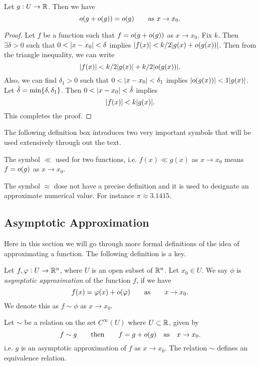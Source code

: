 \begin{lemma}
	\label{lem:LittleOofLittleOsummed}
	Let $ g: U \to \mathbb{R} $. Then we have
	\[ o(g + o(g)) = o (g) \qquad \text{as } x \to x_0. \]
\end{lemma}
\begin{proof}
	Let $ f $ be a function such that $ f = o(g + o(g)) $ as $ x \to x_0 $. Fix $ k $. Then $ \exists \delta > 0 $ such that $ 0 < |x - x_0| < \delta $ implies $ |f(x)| < k/2|g(x) + o(g(x))|$. Then from the triangle inequality, we can write
	\[   |f(x)| < k/2|g(x)| + k/2|o(g(x))|. \]
	Also, we can find $ \delta_1 > 0 $ such that $ 0<\abs{x - x_0} < \delta_1 $ implies $ |o(g(x))| < 1 |g(x)| $. Let $ \hat{\delta} = \min\{\delta, \delta_1\} $. Then $ 0<\abs{x - x_0} < \hat{\delta} $ implies 
	\[ |f(x)| < k|g(x)|.\] 
	This completes the proof.
\end{proof}

The following definition box introduces two very important symbols that will be used extensively through out the text. 

\begin{definition} 
	The symbol $ \ll $ used for two functions, i.e. $ f(x) \ll g(x) $ as $ x\to x_0 $ means $ f = o(g) $ as $ x\to x_0 $.  
	
	\noindent The symbol $ \approx $ dose not have a precise definition and it is used to designate an approximate numerical value. For instance $ \pi \approx 3.1415 $.
\end{definition}


\subsection{Asymptotic Approximation}
Here in this section we will go through more formal definitions of the idea of approximating a function. The following definition is a key.

\begin{definition}
	Let $ f,\varphi: U \to \mathbb{R}^n $, where $ U $ is an open subset of $ \mathbb{R}^n $. Let $ x_0 \in U $. We say $ \phi $ is \emph{asymptotic approximation} of the function $ f $, if we have
	\[ f(x) = \varphi(x) + o(\varphi) \qquad \text{as} \qquad x\to x_0.\]
	We denote this as $ f \sim \phi $ as $ x \to x_0 $.
\end{definition}

\begin{proposition}
	Let $ \sim $ be a relation on  the set $ C^\infty(U) $ where $ U \subset \mathbb{R} $, given by
	\[ f \sim g   \qquad \text{then} \qquad f = g + o(g) \quad \text{as} \quad x\to x_0. \]
	i.e. $ g $ is an asymptotic approximation of $ f $ as $ x\to x_0 $. The relation $ \sim $ defines an equivalence relation.
\end{proposition}

